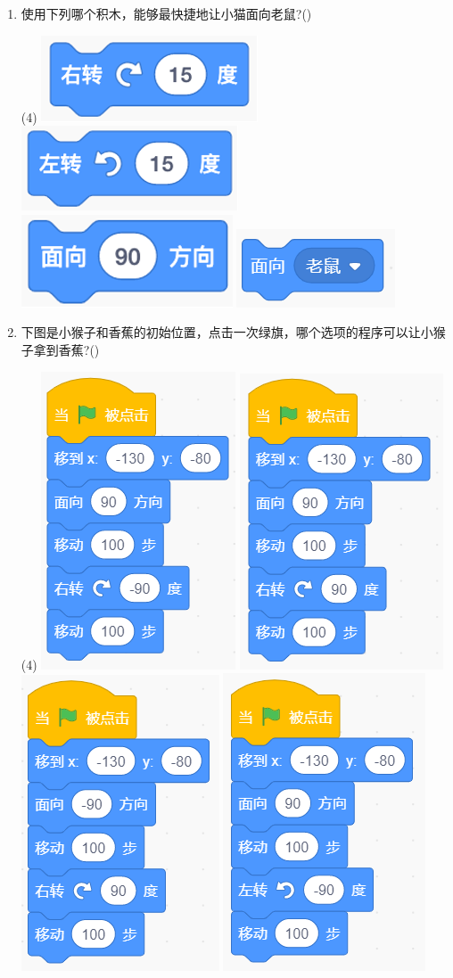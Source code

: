 \documentclass[10pt, a4paper]{article}
\begin{document}
\begin{enumerate}
        \item 使用下列哪个积木，能够最快捷地让小猫面向老鼠?(\qquad)
        \begin{tasks}(4)
            \task \includegraphics[width=.12\textwidth]{18a.png}
            \task \includegraphics[width=.12\textwidth]{18b.png}
            \task \includegraphics[width=.12\textwidth]{18c.png}
            \task \includegraphics[width=.12\textwidth]{18d.png}
        \end{tasks}

        \item 下图是小猴子和香蕉的初始位置，点击一次绿旗，哪个选项的程序可以让小猴子拿到香蕉?(\qquad)
        \begin{tasks}(4)
            \task \includegraphics[width=.12\textwidth]{19a.png}
            \task \includegraphics[width=.12\textwidth]{19b.png}
            \task \includegraphics[width=.12\textwidth]{19c.png}
            \task \includegraphics[width=.12\textwidth]{19d.png}
        \end{tasks}


\end{enumerate}
\end{document}

